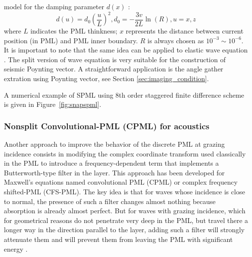 model for the damping parameter $d(x)$ \citep{collino2001application}:
\begin{equation}
 d(u)=d_0(\frac{u}{L})^2, d_0=-\frac{3v}{2L}\ln(R), u=x,z
\end{equation}
where $ L$ indicates the PML thinkness; $x$ represents the distance between current position (in PML) and PML inner boundary. $R$ is always chosen as $10^{-3}\sim 10^{-6}$. It is important to note that the same idea can be applied to elastic wave equation \citep{collino2001application}. The split version of wave equation is very suitable for the construction of seismic Poynting vector. A straightforward application is the angle gather extration using Poynting vector, see Section \ref{sec:imaging_condition}.

A numerical example of SPML using 8th order staggered finite difference scheme is given in Figure~\ref{fig:snapspml}.

% 
% 



\subsubsection{Nonsplit Convolutional-PML (CPML) for acoustics}

Another approach to improve the behavior of the discrete PML at grazing incidence consists in modifying the complex coordinate transform used classically in the PML to introduce a frequency-dependent term that implements a Butterworth-type filter in the layer. This approach has been developed for Maxwell’s equations  named convolutional PML (CPML) \citep{roden2000convolutional} or complex frequency shifted-PML (CFS-PML). The key idea is that for waves whose incidence is close to normal, the presence of such a filter changes almost nothing because absorption is already almost perfect. But for waves with grazing incidence, which for geometrical reasons do not penetrate very deep in the PML, but travel there a longer way in the direction parallel to the layer, adding such a filter will strongly attenuate them and will prevent them from leaving the PML with significant energy .


